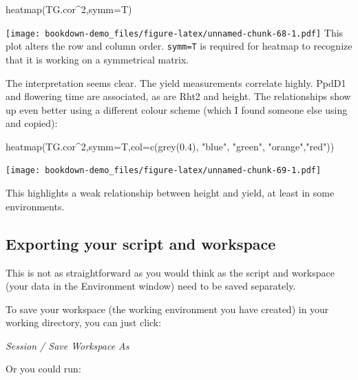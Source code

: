 \documentclass[
]{book}
\newenvironment{Shaded}{\begin{snugshade}}{\end{snugshade}}
\newcommand{\AttributeTok}[1]{\textcolor[rgb]{0.77,0.63,0.00}{#1}}
\newcommand{\DecValTok}[1]{\textcolor[rgb]{0.00,0.00,0.81}{#1}}
\newcommand{\FloatTok}[1]{\textcolor[rgb]{0.00,0.00,0.81}{#1}}
\newcommand{\FunctionTok}[1]{\textcolor[rgb]{0.00,0.00,0.00}{#1}}
\newcommand{\NormalTok}[1]{#1}
\newcommand{\SpecialCharTok}[1]{\textcolor[rgb]{0.00,0.00,0.00}{#1}}
\newcommand{\StringTok}[1]{\textcolor[rgb]{0.31,0.60,0.02}{#1}}
\begin{document}
\begin{Shaded}
\begin{Highlighting}[]
\FunctionTok{heatmap}\NormalTok{(TG.cor}\SpecialCharTok{\^{}}\DecValTok{2}\NormalTok{,}\AttributeTok{symm=}\NormalTok{T)}
\end{Highlighting}
\end{Shaded}

\texttt{[image: bookdown-demo\_files/figure-latex/unnamed-chunk-68-1.pdf]}
This plot alters the row and column order. \texttt{symm=T} is required for heatmap to recognize that it is working on a symmetrical matrix.

The interpretation seems clear. The yield measurements correlate highly. PpdD1 and flowering time are associated, as are Rht2 and height. The relationships show up even better using a different colour scheme (which I found someone else using and copied):

\begin{Shaded}
\begin{Highlighting}[]
\FunctionTok{heatmap}\NormalTok{(TG.cor}\SpecialCharTok{\^{}}\DecValTok{2}\NormalTok{,}\AttributeTok{symm=}\NormalTok{T,}\AttributeTok{col=}\FunctionTok{c}\NormalTok{(}\FunctionTok{grey}\NormalTok{(}\FloatTok{0.4}\NormalTok{), }\StringTok{"blue"}\NormalTok{, }\StringTok{"green"}\NormalTok{, }\StringTok{"orange"}\NormalTok{,}\StringTok{"red"}\NormalTok{))}
\end{Highlighting}
\end{Shaded}

\texttt{[image: bookdown-demo\_files/figure-latex/unnamed-chunk-69-1.pdf]}

This highlights a weak relationship between height and yield, at least in some environments.

\hypertarget{exporting-your-script-and-workspace}{%
\subsection{Exporting your script and workspace}\label{exporting-your-script-and-workspace}}

This is not as straightforward as you would think as the script and workspace (your data in the Environment window) need to be saved separately.

To save your workspace (the working environment you have created) in your working directory, you can just click:

\emph{Session / Save Workspace As}

Or you could run:
\end{document}
